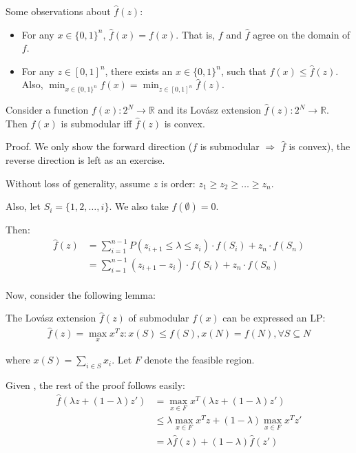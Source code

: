 Some observations about $\hat f(z)$:
\begin{itemize}
	\item For any $x \in \{0, 1\}^n$, $\hat f(x) = f(x)$. That is, $f$ and $\hat f$ agree on the domain of $f$.
	
	\item For any $z \in [0, 1]^n$, there exists an $x \in \{0, 1\}^n$, such that $f(x) \leq \hat f(z)$. Also, $\min_{x \in \{0, 1\}^n} f(x) = \min_{z \in [0,1]^n} \hat f(z)$.
	 
\end{itemize}


\begin{theorem}
Consider a function $f(x) : 2^N \rightarrow \mathbb{R}$ and its Lov\'{a}sz extension $\hat f(z) : 2^N \rightarrow \mathbb{R}$. Then $f(x)$ is submodular iff $\hat f(z)$ is convex.

\end{theorem}
Proof. We only show the forward direction ($f$ is submodular $\Rightarrow$ $\hat f$ is convex), the reverse direction is left as an exercise.

Without loss of generality, assume $z$ is order: $z_1 \geq z_2 \geq \dots \geq z_n$.

Also, let $S_i = \{1, 2, \dots, i\}$. We also take $f(\emptyset) = 0$.

Then:
\begin{align*}
\hat f(z) 
&= \sum_{i=1}^{n-1} P(z_{i+1} \leq \lambda \leq z_i) \cdot f(S_i) + z_n \cdot f(S_n) \\
&= \sum_{i=1}^{n-1} (z_{i+1} - z_i) \cdot f(S_i) + z_n \cdot f(S_n) \\
\end{align*}

Now, consider the following lemma:
\begin{lemma}
The Lov\'{a}sz extension $\hat f(z)$ of submodular $f(x)$ can be expressed an LP:
\begin{align*}
\hat f(z) = \max_x x^T z : x(S) \leq f(S), x(N) = f(N), \forall S \subseteq N
\end{align*}
\end{lemma}
where $x(S) = \sum_{i \in S} x_i$.  Let $F$ denote the feasible region.

Given , the rest of the proof follows easily:
\begin{align*}
\hat f(\lambda z + (1 - \lambda) z') 
&= \max_{x \in F} x^T (\lambda z + (1-\lambda)z') \\
&\leq \lambda \max_{x \in F} x^T z + (1 - \lambda) \max_{x  \in F} x^T z' \\
&= \lambda \hat f(z) + (1 - \lambda) \hat f(z')
\end{align*}



